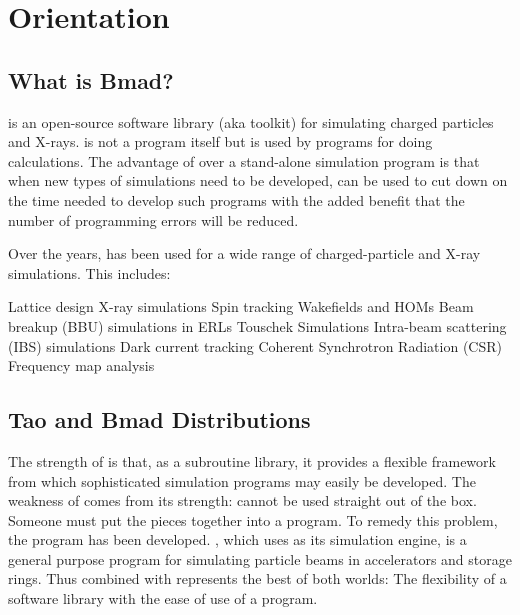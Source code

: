 \chapter{Orientation}
\label{c:orient}

\section{What is Bmad?}

\bmad is an open-source software library (aka toolkit) for simulating charged particles and
X-rays. \bmad is not a program itself but is used by programs for doing calculations. The advantage
of \bmad over a stand-alone simulation program is that when new types of simulations need to be
developed, \bmad can be used to cut down on the time needed to develop such programs with the added
benefit that the number of programming errors will be reduced.

Over the years, \bmad has been used for a wide range of charged-particle and X-ray simulations. This
includes:
\begin{example}
Lattice design                                  X-ray simulations
Spin tracking                                   Wakefields and HOMs
Beam breakup (BBU) simulations in ERLs          Touschek Simulations
Intra-beam scattering (IBS) simulations         Dark current tracking
Coherent Synchrotron Radiation (CSR)            Frequency map analysis
\end{example}

\section{Tao and Bmad Distributions}
\label{s:tao.intro}

The strength of \bmad is that, as a subroutine library, it provides a flexible framework from which
sophisticated simulation programs may easily be developed. The weakness of \bmad comes from its
strength: \bmad cannot be used straight out of the box. Someone must put the pieces together into a
program. To remedy this problem, the \tao program\cite{b:tao} has been developed. \tao, which uses
\bmad as its simulation engine, is a general purpose program for simulating particle beams in
accelerators and storage rings. Thus \bmad combined with \tao represents the best of both worlds:
The flexibility of a software library with the ease of use of a program.

